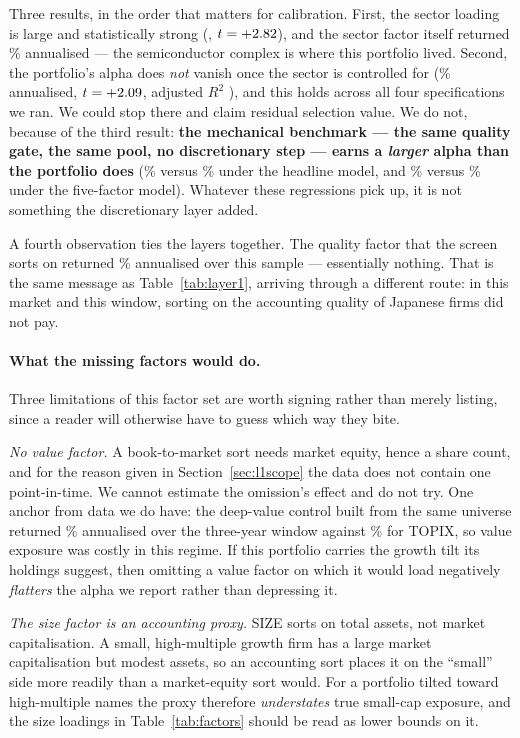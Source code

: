 \documentclass[a4paper,11pt]{article}
\begin{document}
Three results, in the order that matters for calibration. First, the sector loading is large and
statistically strong (\FaHeadOursSector, $t=+2.82$), and the sector factor itself
returned \FaSectorAnn\% annualised --- the semiconductor complex is where this portfolio lived.
Second, the portfolio's alpha does \emph{not} vanish once the sector is controlled for
(\FaHeadOursAlpha\% annualised, $t=+2.09$, adjusted $R^2$ \FaHeadOursRtwo), and this holds
across all four specifications we ran. We could stop there and claim residual selection value. We do
not, because of the third result: \textbf{the mechanical benchmark --- the same quality gate, the same
pool, no discretionary step --- earns a \emph{larger} alpha than the portfolio does}
(\FaHeadBenchAlpha\% versus \FaHeadOursAlpha\% under the headline model, and
\FaBenchAlpha\% versus \FaOursAlpha\% under the five-factor model). Whatever these regressions pick
up, it is not something the discretionary layer added.

A fourth observation ties the layers together. The quality factor that the screen sorts on returned
\FaQmjAnn\% annualised over this sample --- essentially nothing. That is the same message as
Table~\ref{tab:layer1}, arriving through a different route: in this market and this window, sorting on
the accounting quality of Japanese firms did not pay.

\paragraph{What the missing factors would do.} Three limitations of this factor set are worth signing
rather than merely listing, since a reader will otherwise have to guess which way they bite.

\emph{No value factor.} A book-to-market sort needs market equity, hence a share count, and for the
reason given in Section~\ref{sec:l1scope} the data does not contain one point-in-time. We cannot
estimate the omission's effect and do not try. One anchor from data we do have: the deep-value
control built from the same universe returned \FaGrahamAnn\% annualised over the three-year window
against \FaGrahamTopix\% for TOPIX, so value exposure was costly in this regime. If this portfolio
carries the growth tilt its holdings suggest, then omitting a value factor on which it would load
negatively \emph{flatters} the alpha we report rather than depressing it.

\emph{The size factor is an accounting proxy.} SIZE sorts on total assets, not market capitalisation.
A small, high-multiple growth firm has a large market capitalisation but modest assets, so an
accounting sort places it on the ``small'' side more readily than a market-equity sort would. For a
portfolio tilted toward high-multiple names the proxy therefore \emph{understates} true small-cap
exposure, and the size loadings in Table~\ref{tab:factors} should be read as lower bounds on it.
\end{document}
